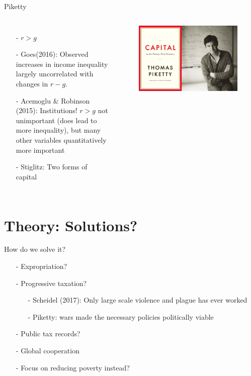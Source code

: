 \documentclass{beamer}
\begin{document}
\begin{frame}{Piketty}
\begin{columns}
\begin{itemize}
    \item[-]$r>g$
    \item[-]Goes(2016): Observed increases in income inequality largely uncorrelated with changes in $r-g$.\pause
    \item[-]Acemoglu \& Robinson (2015): Institutions! $r>g$ not unimportant (does lead to more inequality), but many other variables quantitatively more important\pause
    \item[-]Stiglitz: Two forms of capital
\end{itemize}{}
\begin{figure}
    \centering
    \includegraphics[width=\textwidth]{../img/PikettyCapital.jpg}
\end{figure}{}
\end{columns}
\end{frame}{}


\section{Theory: Solutions?}

\begin{frame}{}
\centering
\alert{\Large{How do we solve it?}} %
\end{frame}

\begin{frame}{}
\begin{itemize}
    \item[-] Expropriation? \pause
    \item[-]Progressive taxation? \pause
    \begin{itemize}
        \item[-]Scheidel (2017): Only large scale violence and plague has ever worked\pause
        \item[-]Piketty: wars made the necessary policies politically viable\pause
    \end{itemize}{}
    \item[-]Public tax records?\pause
    \item[-]Global cooperation\pause
    \item[-]Focus on reducing poverty instead?
\end{itemize}{}
\end{frame}{}
\end{document}
